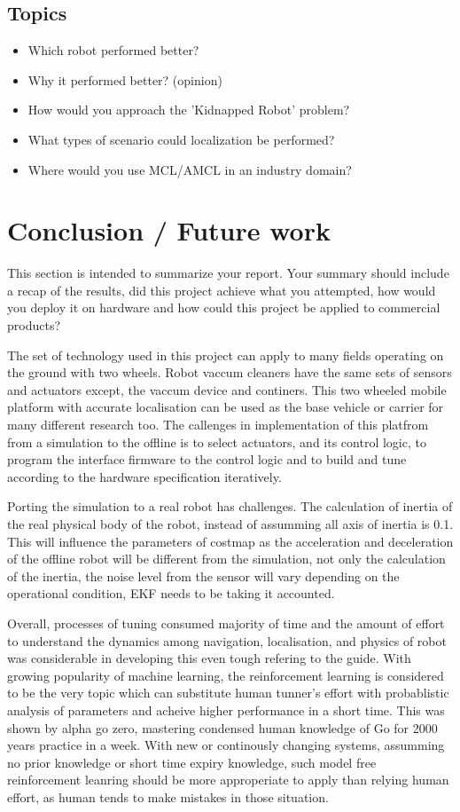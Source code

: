 \documentclass[10pt,journal,compsoc]{IEEEtran}
\begin{document}
\subsection{Topics}
\begin{itemize}
\item Which robot performed better?
\item Why it performed better? (opinion)
\item How would you approach the 'Kidnapped Robot' problem?
\item What types of scenario could localization be performed?
\item Where would you use MCL/AMCL in an industry domain?
\end {itemize}

\section{Conclusion / Future work}
This section is intended to summarize your report. Your summary should include a recap of the results, did this project achieve what you attempted, how would you deploy it on hardware and how could this project be applied to commercial products? 

The set of technology used in this project can apply to many fields operating on the ground with two wheels. Robot vaccum cleaners have the same sets of sensors and actuators except, the vaccum device and continers. This two wheeled mobile platform with accurate localisation can be used as the base vehicle or carrier for many different research too. The callenges in implementation of this platfrom from a simulation to the offline is to select actuators, and its control logic, to program the interface firmware to the control logic and to build and tune according to the hardware specification iteratively.

Porting the simulation to a real robot has challenges. The calculation of inertia of the real physical body of the robot, instead of assumming all axis of inertia is 0.1. This will influence the parameters of costmap as the acceleration and deceleration of the offline robot will be different from the simulation, not only the calculation of the inertia, the noise level from the sensor will vary depending on the operational condition, EKF needs to be taking it accounted.

Overall, processes of tuning consumed majority of time and the amount of effort to understand the dynamics among navigation, localisation, and physics of robot was considerable in developing this even tough refering to the guide. With growing popularity of machine learning, the reinforcement learning is considered to be the very topic which can substitute human tunner's effort with probablistic analysis of parameters and acheive higher performance in a short time. This was shown by alpha go zero, mastering condensed human knowledge of Go for 2000 years  practice in a week. With new or continously changing systems, assumming no prior knowledge or short time expiry knowledge, such model free reinforcement leanring should be more approperiate to apply than relying human effort, as human tends to make mistakes in those situation.
\end{document}
